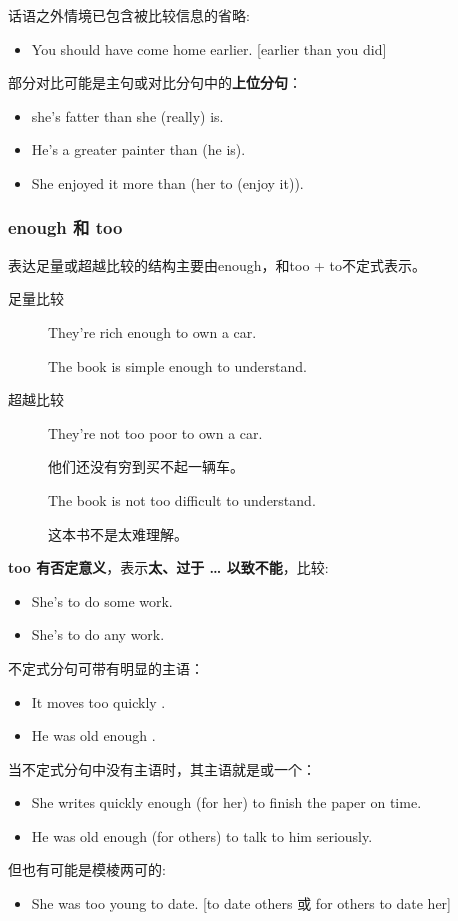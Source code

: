 话语之外情境已包含被比较信息的省略:
\begin{itemize}
\item You should have come home earlier. [earlier than you did]
\end{itemize}

部分对比可能是主句或对比分句中的\textbf{上位分句}：
\begin{itemize}
\item {} she's fatter than she (really) is.
\item He's a greater painter than  (he is).
\item She enjoyed it more than  (her to (enjoy it)).
\end{itemize}

\subsubsection{enough 和 too}

表达足量或超越比较的结构主要由enough，和too + to不定式表示。
\begin{description}
\item[足量比较] They're rich enough to own a car.

  The book is simple enough to understand.

\item[超越比较] They're not too poor to own a car.

  他们还没有穷到买不起一辆车。

  The book is not too difficult to understand.

  这本书不是太难理解。
\end{description}

\textbf{too 有否定意义}，表示\textbf{太、过于 \ldots{} 以致不能}，比较:
\begin{itemize}
\item She's  to do some work.
\item She's  to do any work.
\end{itemize}
不定式分句可带有明显的主语：
\begin{itemize}
\item It moves too quickly .
\item He was old enough .
\end{itemize}
当不定式分句中没有主语时，其主语就是或一个：
\begin{itemize}
\item She writes quickly enough (for her) to finish the paper on time.

\item He was old enough (for others) to talk to him seriously.
\end{itemize}
但也有可能是模棱两可的:
\begin{itemize}
\item She was too young to date. [to date others 或 for others to date her]
\end{itemize}

